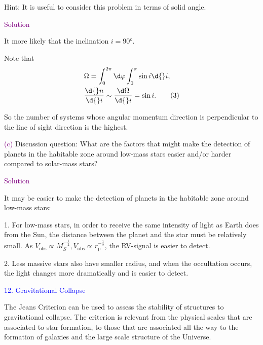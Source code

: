 \documentclass[UTF8, 12pt, a4paper, oneside, twocolumn, fontset=none]{ctexart}
\begin{document}
\noindent Hint: It is useful to consider this problem in terms of solid angle.

\hspace*{\fill}

\noindent\textcolor{purple}{Solution}

It more likely that the inclination $i=\ang{90;;}$.

Note that
\begin{align}
&\Omega=\int_{0}^{2\pi}\d\varphi\int_{0}^{\pi}\sin{i}\d{}i,\notag\\
&\frac{\d{}n}{\d{}i}\sim\frac{\d\Omega}{\d{}i}=\sin{i}.\tag{3}
\end{align}

So the number of systems whose angular momentum direction is perpendicular to the line of sight direction is the highest.

\hspace*{\fill}

\noindent\textcolor{purple}{(c)} Discussion question: What are the factors that might make the detection of planets in the habitable zone around low-mass stars easier and/or harder compared to solar-mass stars?

\hspace*{\fill}

\noindent\textcolor{purple}{Solution}

It may be easier to make the detection of planets in the habitable zone around low-mass stars:

1. For low-mass stars, in order to receive the same intensity of light as Earth does from the Sun, the distance between the planet and the star must be relatively small. As $V_{\mathrm{obs}}\propto{}M_{S}^{-\frac{1}{2}}, V_{\mathrm{obs}}\propto{}r_{\mathrm{p}}^{-\frac{1}{2}}$, the RV-signal is easier to detect.

2. Less massive stars also have smaller radius, and when the occultation occurs, the light changes more dramatically and is easier to detect.

\hspace*{\fill}

\noindent\textcolor{blue}{12. Gravitational Collapse}

\noindent The Jeans Criterion can be used to assess the stability of structures to gravitational collapse. The criterion is relevant from the physical scales that are associated to star formation, to those that are associated all the way to the formation of galaxies and the large scale structure of the Universe.
\end{document}
